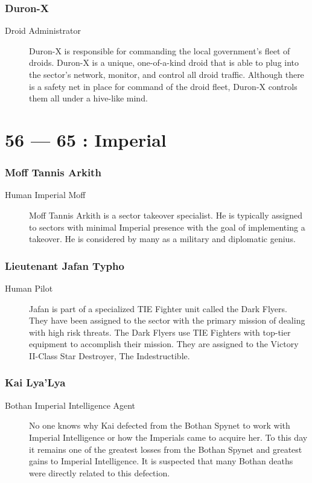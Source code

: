 \documentclass{article}
\begin{document}
\section{Duron-X}
\begin{description}
	\item [Droid Administrator] Duron-X is responsible for commanding the local government’s fleet of droids. Duron-X is a unique, one-of-a-kind droid that is able to plug into the sector’s network, monitor, and control all droid traffic. Although there is a safety net in place for command of the droid fleet, Duron-X controls them all under a hive-like mind.
\end{description}

\part*{56 --- 65 : Imperial}
\setcounter{section}{55}
\section{Moff Tannis Arkith}
\begin{description}
	\item [Human \male Imperial Moff] Moff Tannis Arkith is a sector takeover specialist. He is typically assigned to sectors with minimal Imperial presence with the goal of implementing a takeover. He is considered by many as a military and diplomatic genius.
\end{description}
\section{Lieutenant Jafan Typho}
\begin{description}
	\item [Human \male Pilot] Jafan is part of a specialized TIE Fighter unit called the Dark Flyers. They have been assigned to the sector with the primary mission of dealing with high risk threats. The Dark Flyers use TIE Fighters with top-tier equipment to accomplish their mission. They are assigned to the Victory II-Class Star Destroyer, The Indestructible.
\end{description}
\section{Kai Lya’Lya}
\begin{description}
	\item [Bothan \female Imperial Intelligence Agent] No one knows why Kai defected from the Bothan Spynet to work with Imperial Intelligence or how the Imperials came to acquire her. To this day it remains one of the greatest losses from the Bothan Spynet and greatest gains to Imperial Intelligence. It is suspected that many Bothan deaths were directly related to this defection.
\end{description}
\end{document}
